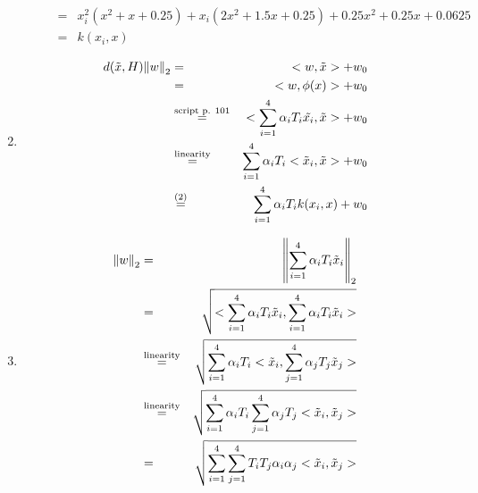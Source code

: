 \documentclass[DIN, pagenumber=false, fontsize=11pt, parskip=half]{scrartcl}
\begin{document}
\begin{enumerate}
\begin{enumerate}[label=\alph*)]
\begin{eqnarray*}
                            &=& x_i^2 (x^2 + x + 0.25)
                                + x_i (2 x^2 + 1.5 x + 0.25)
                                + 0.25 x^2 + 0.25 x + 0.0625 \\
                            &=& k(x_i, x)
                    \end{eqnarray*}
            \end{enumerate}
            \setcounter{enumi}{5}
        \item
            \begin{eqnarray*}
                d(\tilde{x}, H) \norm{w}_2 &=& <w, \tilde{x}> + w_0 \\
                    &=& <w, \phi(x)> + w_0 \\
                    &\stackrel{\text{script p. 101}}{=}& <\sum_{i=1}^4 \alpha_i T_i \tilde{x_i}, \tilde{x}> + w_0 \\
                    &\stackrel{\text{linearity}}{=}& \sum_{i=1}^4 \alpha_i T_i <\tilde{x}_i, \tilde{x}> + w_0 \\
                    &\stackrel{\text{(2)}}{=}& \sum_{i=1}^4 \alpha_i T_i k(x_i,x) + w_0
            \end{eqnarray*}
        \item
            \begin{eqnarray*}
                \norm{w}_2 &=& \norm{\sum_{i=1}^4 \alpha_i T_i \tilde{x}_i}_2 \\
                    &=& \sqrt{<\sum_{i=1}^4 \alpha_i T_i \tilde{x}_i, \sum_{i=1}^4 \alpha_i T_i \tilde{x}_i>} \\
                    &\stackrel{\text{linearity}}{=}& \sqrt{\sum_{i=1}^4 \alpha_i T_i <\tilde{x}_i, \sum_{j=1}^4 \alpha_j T_j \tilde{x}_j>} \\
                    &\stackrel{\text{linearity}}{=}& \sqrt{\sum_{i=1}^4 \alpha_i T_i \sum_{j=1}^4 \alpha_j T_j <\tilde{x}_i, \tilde{x}_j>} \\
                    &=& \sqrt{\sum_{i=1}^4 \sum_{j=1}^4 T_i T_j \alpha_i \alpha_j <\tilde{x}_i, \tilde{x}_j>} \\
            \end{eqnarray*}
    \end{enumerate}
\end{document}
